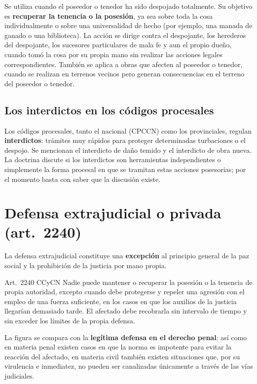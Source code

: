 \documentclass[12pt,oneside]{book}
\begin{document}
Se utiliza cuando el poseedor o tenedor ha sido despojado totalmente. Su objetivo es \textbf{recuperar la tenencia o la posesión}, ya sea sobre toda la cosa individualmente o sobre una universalidad de hecho (por ejemplo, una manada de ganado o una biblioteca). La acción se dirige contra el despojante, los herederos del despojante, los sucesores particulares de mala fe y aun el propio dueño, cuando tomó la cosa por su propia mano sin realizar las acciones legales correspondientes. También se aplica a obras que afecten al poseedor o tenedor, cuando se realizan en terrenos vecinos pero generan consecuencias en el terreno del poseedor o tenedor.

\subsection{Los interdictos en los códigos procesales}

Los códigos procesales, tanto el nacional (CPCCN) como los provinciales, regulan \textbf{interdictos}: trámites muy rápidos para proteger determinadas turbaciones o el despojo. Se mencionan el interdicto de daño temido y el interdicto de obra nueva. La doctrina discute si los interdictos son herramientas independientes o simplemente la forma procesal en que se tramitan estas acciones posesorias; por el momento basta con saber que la discusión existe.

\section{Defensa extrajudicial o privada (art.~2240)}

La defensa extrajudicial constituye una \textbf{excepción} al principio general de la paz social y la prohibición de la justicia por mano propia.

\begin{regla}{Art.~2240 CCyCN}
Nadie puede mantener o recuperar la posesión o la tenencia de propia autoridad, excepto cuando debe protegerse y repeler una agresión con el empleo de una fuerza suficiente, en los casos en que los auxilios de la justicia llegarían demasiado tarde. El afectado debe recobrarla sin intervalo de tiempo y sin exceder los límites de la propia defensa.
\end{regla}

La figura se compara con la \textbf{legítima defensa en el derecho penal}: así como en materia penal existen casos en que la norma es impotente para evitar la reacción del afectado, en materia civil también existen situaciones que, por su virulencia e inmediatez, no pueden ser canalizadas únicamente a través de las vías judiciales.
\end{document}
